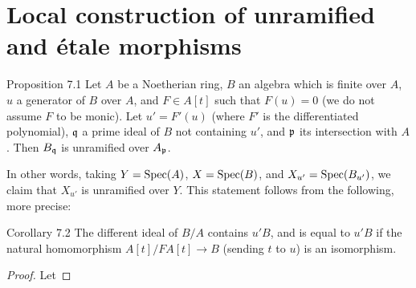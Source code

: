 \section{Local construction of unramified and étale morphisms}
\label{I.7}

\begin{itenv}{Proposition 7.1}
\label{I.7.1}
  Let $A$ be a Noetherian ring, $B$ an algebra which is finite over $A$, $u$ a generator of $B$ over $A$, and $F\in A[t]$ such that $F(u)=0$ (we do not assume $F$ to be monic).
  Let $u'=F'(u)$ (where $F'$ is the differentiated polynomial), $\frak{q}$ a prime ideal of $B$ not containing $u'$, and $\frak{p}$ its intersection with $A$.
  Then $B_\frak{q}$ is unramified over $A_\frak{p}$.
\end{itenv}

In other words, taking $Y=\Spec(A)$, $X=\Spec(B)$, and $X_{u'}=\Spec(B_{u'})$, we claim that $X_{u'}$ is unramified over $Y$.
This statement follows from the following, more precise:

\begin{itenv}{Corollary 7.2}
\label{I.7.2}
  The different ideal of $B/A$ contains $u'B$, and is equal to $u'B$ if the natural homomorphism $A[t]/FA[t]\to B$ (sending $t$ to $u$) is an isomorphism.
\end{itenv}

\begin{proof}
  Let
\end{proof}
